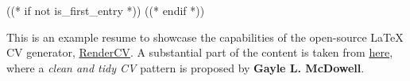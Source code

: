 ((* if not is_first_entry *))
\vspace{<<design.margins.entry_area.vertical_between>>}
((* endif *))

\begin{onecolentry}
    This is an example resume to showcase the capabilities of the open-source LaTeX CV generator, \href{https://github.com/sinaatalay/rendercv}{RenderCV}. A substantial part of the content is taken from \href{https://www.careercup.com/resume}{here}, where a \textit{clean and tidy CV} pattern is proposed by \textbf{Gayle L. McDowell}.
\end{onecolentry}